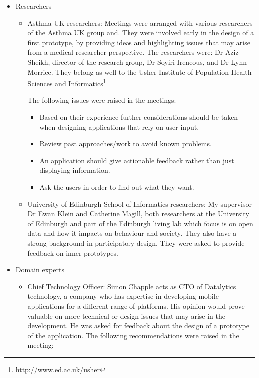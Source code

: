 \begin{itemize}
	\item Researchers 
    \begin{itemize}
      \item Asthma UK researchers: Meetings were arranged with various researchers of the Asthma UK group and. They were involved early in the design of a first prototype, by providing ideas and highlighting issues that may arise from a medical researcher perspective. The researchers were:  Dr Aziz Sheikh, director of the research group, Dr Soyiri Ireneous, and Dr Lynn Morrice. They belong as well to the Usher Institute of Population Health Sciences and Informatics\footnote{\url{http://www.ed.ac.uk/usher}}
      
    The following issues were raised in the meetings:
      \begin{itemize}
          \item Based on their experience further considerations should be taken when designing applications that rely on user input.
          \item Review past approaches/work to avoid known problems.
          \item An application should give actionable feedback rather than just displaying information.
          \item Ask the users in order to find out what they want.
      \end{itemize}
      \item University of Edinburgh School of Informatics researchers: My supervisor Dr Ewan Klein and Catherine Magill, both researchers at the University of Edinburgh and part of the Edinburgh living lab which focus is on open data and how it impacts on behaviour and society. They also have a strong background in participatory design. They were asked to provide feedback on inner prototypes.
	\end{itemize}
	\item Domain experts    
   \begin{itemize}
      \item Chief Technology Officer: Simon Chapple acts as CTO of Datalytics technology, a company who has expertise in developing mobile applications for a different range of platforms. His opinion would prove valuable on more technical or design issues that may arise in the development. He was asked for feedback about the design of a prototype of the application.
    The following recommendations were raised in the meeting:
    \begin{itemize}

\end{itemize}
\end{itemize}
\end{itemize}
